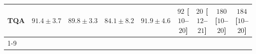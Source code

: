 \begin{tabular}{l|cccc|cccc|}
TQA & {\cellcolor[HTML]{0872B1}} \color[HTML]{F1F1F1} $91.4\pm 3.7$ & {\cellcolor[HTML]{2081B9}} \color[HTML]{F1F1F1} $89.8\pm 3.3$ & {\cellcolor[HTML]{7DACD1}} \color[HTML]{F1F1F1} $84.1\pm 8.2$ & {\cellcolor[HTML]{056FAE}} \color[HTML]{F1F1F1} $91.9\pm 4.6$ & {\cellcolor[HTML]{F769A1}} \color[HTML]{F1F1F1} $92$ [$10$--$20$] & {\cellcolor[HTML]{FDE4E1}} \color[HTML]{000000} $20$ [$12$--$21$] & {\cellcolor[HTML]{51006C}} \color[HTML]{F1F1F1} $180$ [$10$--$20$] & {\cellcolor[HTML]{49006A}} \color[HTML]{F1F1F1} $184$ [$10$--$20$] \\
\cline{1-9}
\bottomrule
\end{tabular}
